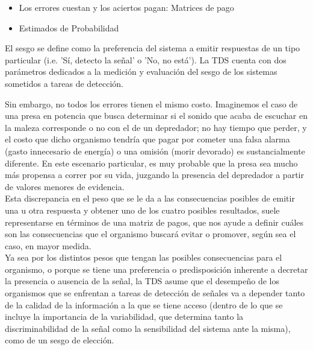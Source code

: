     \begin{itemize}
      \item{Los errores cuestan y los aciertos pagan: Matrices de pago}\\

      \item{Estimados de Probabilidad}

     \end{itemize}

El sesgo se define como la preferencia del sistema a emitir respuestas de un tipo particular (i.e. 'Sí, detecto la señal' o 'No, no está'). La TDS cuenta con dos parámetros dedicados a la medición y evaluación del sesgo de los sistemas sometidos a tareas de detección.

Sin embargo, no todos los errores tienen el mismo costo. Imaginemos el caso de una presa en potencia que busca determinar si el sonido que acaba de escuchar en la maleza corresponde o no con el de un depredador; no hay tiempo que perder, y el costo que dicho organismo tendría que pagar por cometer una falsa alarma (gasto innecesario de energía) o una omisión (morir devorado) es sustancialmente diferente. En este escenario particular, es muy probable que la presa sea mucho más propensa a correr por su vida, juzgando la presencia del depredador a partir de valores menores de evidencia.\\

Esta discrepancia en el peso que se le da a las consecuencias posibles de emitir una u otra respuesta y obtener uno de los cuatro posibles resultados, suele representarse en términos de una matriz de pagos, que nos ayude a definir cuáles son las consecuencias que el organismo buscará evitar o promover, según sea el caso, en mayor medida.\\

Ya sea por los distintos pesos que tengan las posibles consecuencias para el organismo, o porque se tiene una preferencia o predisposición inherente a decretar la presencia o ausencia de la señal, la TDS asume que el desempeño de los organismos que se enfrentan a tareas de detección de señales va a depender tanto de la calidad de la información a la que se tiene acceso (dentro de lo que se incluye la importancia de la variabilidad, que determina tanto la discriminabilidad de la señal como la sensibilidad del sistema ante la misma), como de un sesgo de elección.\\

